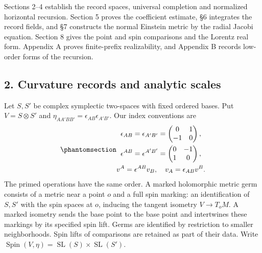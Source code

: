 \documentclass[
  english,
  11pt,
  reqno]{amsart}
\begin{document}
Sections 2--4 establish the record spaces, universal completion and
normalized horizontal recursion. Section 5 proves the coefficient
estimate, §6 integrates the record fields, and §7 constructs the normal
Einstein metric by the radial Jacobi equation. Section 8 gives the point
and spin comparisons and the Lorentz real form. Appendix A proves
finite-prefix realizability, and Appendix B records low-order forms of
the recursion.

\protect{}\label{sec:es-records}

\subsection{2. Curvature records and analytic
scales}\label{curvature-records-and-analytic-scales}

Let \(S,S'\) be complex symplectic two-spaces with fixed ordered bases.
Put \(V=S\otimes S'\) and
\(\eta_{AA'BB'}=\epsilon_{AB}\epsilon_{A'B'}\). Our index conventions
are
\begin{equation}\protect\phantomsection\label{eq:es-spin-conventions}{\begin{gathered}
\epsilon_{AB}=\epsilon_{A'B'}=
 \begin{pmatrix}0&1\\-1&0\end{pmatrix}, \\
\epsilon^{AB}=\epsilon^{A'B'}=
 \begin{pmatrix}0&-1\\1&0\end{pmatrix}, \\
v^A=\epsilon^{AB}v_B,\quad v_A=\epsilon_{AB}v^B .
\end{gathered}}\end{equation} The primed operations have the same order. A marked
holomorphic metric germ consists of a metric near a point \(o\) and a
full spin marking: an identification of \(S,S'\) with the spin spaces at
\(o\), inducing the tangent isometry \(V\to T_oM\). A marked isometry
sends the base point to the base point and intertwines these markings by
its specified spin lift. Germs are identified by restriction to smaller
neighborhoods. Spin lifts of comparisons are retained as part of their
data. Write
\(\operatorname{Spin}(V,\eta)=\operatorname{SL}(S)\times\operatorname{SL}(S')\).
\end{document}
